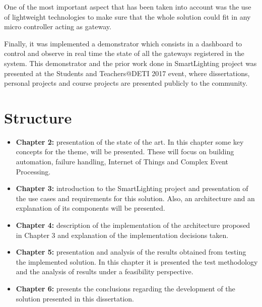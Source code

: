One of the most important aspect that has been taken into account was the use of lightweight technologies to make sure that the whole solution could fit in any micro controller acting as gateway.

Finally, it was implemented a demonstrator which consists in a dashboard to control and observe in real time the state of all the gateways registered in the system. This demonstrator and the prior work done in SmartLighting project was presented at the Students and Teachers@DETI 2017 event, where dissertations, personal projects and course projects are presented publicly to the community.

\section{Structure}

\begin{itemize}

	\item{\textbf{Chapter 2:} presentation of the state of the art. In this chapter some key concepts
		for the theme, will be presented. These will focus on building automation, failure handling, Internet of Things and Complex Event Processing.}
	\item{\textbf{Chapter 3:} introduction to the SmartLighting project and presentation of the use cases and requirements for this solution. Also, an architecture and an explanation of its components will be presented.}
	\item{\textbf{Chapter 4:} description of the implementation of the architecture proposed in Chapter 3 and explanation of the implementation decisions taken.}
	\item{\textbf{Chapter 5:} presentation and analysis of the results obtained from testing the
		implemented solution. In this chapter it is presented the test methodology and the analysis of results under a feasibility perspective.}
	\item{\textbf{Chapter 6:} presents the conclusions regarding the development of the solution presented in this dissertation.}

\end{itemize}